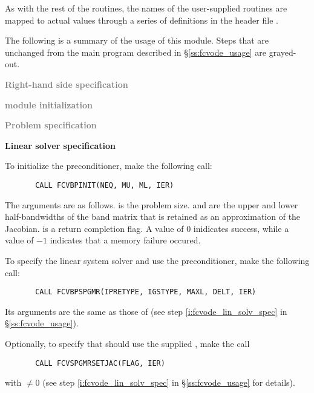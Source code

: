 As with the rest of the {\fcvode} routines, the names of the user-supplied routines 
are mapped to actual values through a series of definitions in the header file 
.

The following is a summary of the usage of this module. Steps that are unchanged from 
the main program described in \S\ref{ss:fcvode_usage} are grayed-out.

\begin{Steps}
  
\item \textcolor{gray}{\bf Right-hand side specification}

\item \textcolor{gray}{\bf {\nvector} module initialization}

\item \textcolor{gray}{\bf Problem specification}

\item {\bf Linear solver specification}

  To initialize the {\cvbandpre} preconditioner, make the following call:
\begin{verbatim}
       CALL FCVBPINIT(NEQ, MU, ML, IER)
\end{verbatim}
  The arguments are as follows.
   is the problem size.
   and  are the upper and lower half-bandwidths of the band matrix that 
  is retained as an approximation of the Jacobian.
   is a return completion flag.  A value of $0$ inidicates success, while 
  a value of $-1$ indicates that a memory failure occured.
  
  To specify the {\spgmr} linear system solver and use the {\cvbandpre}
  preconditioner, make the following call:
\begin{verbatim}
       CALL FCVBPSPGMR(IPRETYPE, IGSTYPE, MAXL, DELT, IER)
\end{verbatim}
  Its arguments are the same as those of 
  (see step \ref{i:fcvode_lin_solv_spec} in \S\ref{ss:fcvode_usage}).
  

  Optionally, to specify that {\spgmr} should use the supplied , 
  make the call
\begin{verbatim}
       CALL FCVSPGMRSETJAC(FLAG, IER)
\end{verbatim}
  with $\neq 0$ 
  (see step \ref{i:fcvode_lin_solv_spec} in \S\ref{ss:fcvode_usage} for details).
  

\end{Steps}
